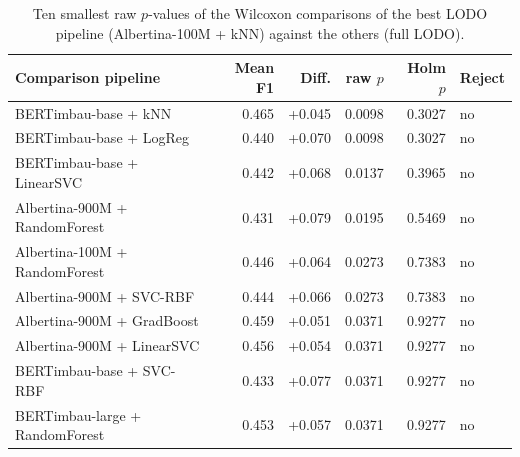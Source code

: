 \begin{table}[t]
\centering
\small
\caption{Ten smallest raw $p$-values of the Wilcoxon comparisons of the best LODO pipeline (Albertina-100M + kNN) against the others (full LODO).}
\label{tab:lodo-posthoc}
\begin{tabular}{lrrrrl}
\toprule
Comparison pipeline & Mean F1 & Diff. & raw $p$ & Holm $p$ & Reject \\
\midrule
BERTimbau-base + kNN & 0.465 & +0.045 & 0.0098 & 0.3027 & no \\
BERTimbau-base + LogReg & 0.440 & +0.070 & 0.0098 & 0.3027 & no \\
BERTimbau-base + LinearSVC & 0.442 & +0.068 & 0.0137 & 0.3965 & no \\
Albertina-900M + RandomForest & 0.431 & +0.079 & 0.0195 & 0.5469 & no \\
Albertina-100M + RandomForest & 0.446 & +0.064 & 0.0273 & 0.7383 & no \\
Albertina-900M + SVC-RBF & 0.444 & +0.066 & 0.0273 & 0.7383 & no \\
Albertina-900M + GradBoost & 0.459 & +0.051 & 0.0371 & 0.9277 & no \\
Albertina-900M + LinearSVC & 0.456 & +0.054 & 0.0371 & 0.9277 & no \\
BERTimbau-base + SVC-RBF & 0.433 & +0.077 & 0.0371 & 0.9277 & no \\
BERTimbau-large + RandomForest & 0.453 & +0.057 & 0.0371 & 0.9277 & no \\
\bottomrule
\end{tabular}
\end{table}
